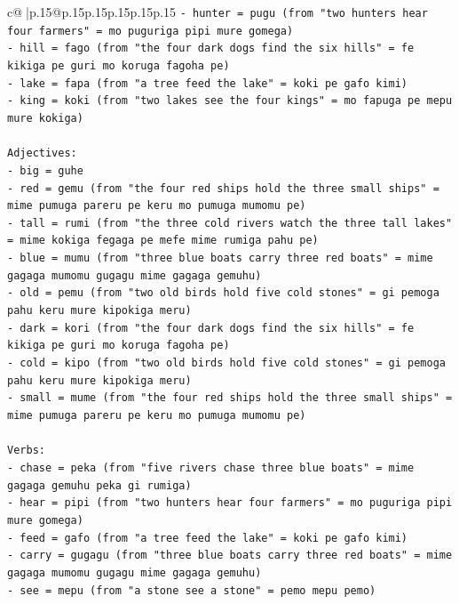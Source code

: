 \documentclass{article}
\begin{document}
{\begin{supertabular}{c@{$\;$}|p{.15\linewidth}@{}p{.15\linewidth}p{.15\linewidth}p{.15\linewidth}p{.15\linewidth}p{.15\linewidth}}
{{{\texttt{{-} hunter = pugu (from "two hunters hear four farmers" = mo puguriga pipi mure gomega)} \\
\texttt{{-} hill = fago (from "the four dark dogs find the six hills" = fe kikiga pe guri mo koruga fagoha pe)} \\
\texttt{{-} lake = fapa (from "a tree feed the lake" = koki pe gafo kimi)} \\
\texttt{{-} king = koki (from "two lakes see the four kings" = mo fapuga pe mepu mure kokiga)} \\
\\ 
\texttt{Adjectives:} \\
\texttt{{-} big = guhe} \\
\texttt{{-} red = gemu (from "the four red ships hold the three small ships" = mime pumuga pareru pe keru mo pumuga mumomu pe)} \\
\texttt{{-} tall = rumi (from "the three cold rivers watch the three tall lakes" = mime kokiga fegaga pe mefe mime rumiga pahu pe)} \\
\texttt{{-} blue = mumu (from "three blue boats carry three red boats" = mime gagaga mumomu gugagu mime gagaga gemuhu)} \\
\texttt{{-} old = pemu (from "two old birds hold five cold stones" = gi pemoga pahu keru mure kipokiga meru)} \\
\texttt{{-} dark = kori (from "the four dark dogs find the six hills" = fe kikiga pe guri mo koruga fagoha pe)} \\
\texttt{{-} cold = kipo (from "two old birds hold five cold stones" = gi pemoga pahu keru mure kipokiga meru)} \\
\texttt{{-} small = mume (from "the four red ships hold the three small ships" = mime pumuga pareru pe keru mo pumuga mumomu pe)} \\
\\ 
\texttt{Verbs:} \\
\texttt{{-} chase = peka (from "five rivers chase three blue boats" = mime gagaga gemuhu peka gi rumiga)} \\
\texttt{{-} hear = pipi (from "two hunters hear four farmers" = mo puguriga pipi mure gomega)} \\
\texttt{{-} feed = gafo (from "a tree feed the lake" = koki pe gafo kimi)} \\
\texttt{{-} carry = gugagu (from "three blue boats carry three red boats" = mime gagaga mumomu gugagu mime gagaga gemuhu)} \\
\texttt{{-} see = mepu (from "a stone see a stone" = pemo mepu pemo)} \\
}}}
\end{supertabular}}
\end{document}
